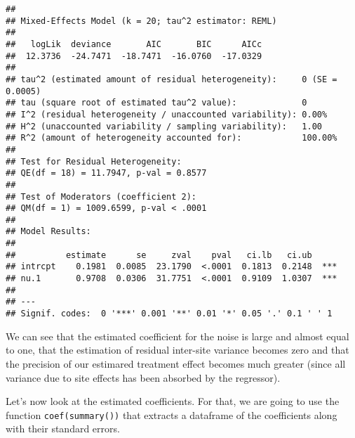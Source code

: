 \documentclass[]{book}
\theoremstyle{definition}
\theoremstyle{definition}
\theoremstyle{definition}
\theoremstyle{remark}
\begin{document}
\begin{verbatim}
## 
## Mixed-Effects Model (k = 20; tau^2 estimator: REML)
## 
##   logLik  deviance       AIC       BIC      AICc 
##  12.3736  -24.7471  -18.7471  -16.0760  -17.0329   
## 
## tau^2 (estimated amount of residual heterogeneity):     0 (SE = 0.0005)
## tau (square root of estimated tau^2 value):             0
## I^2 (residual heterogeneity / unaccounted variability): 0.00%
## H^2 (unaccounted variability / sampling variability):   1.00
## R^2 (amount of heterogeneity accounted for):            100.00%
## 
## Test for Residual Heterogeneity:
## QE(df = 18) = 11.7947, p-val = 0.8577
## 
## Test of Moderators (coefficient 2):
## QM(df = 1) = 1009.6599, p-val < .0001
## 
## Model Results:
## 
##          estimate      se     zval    pval   ci.lb   ci.ub 
## intrcpt    0.1981  0.0085  23.1790  <.0001  0.1813  0.2148  *** 
## nu.1       0.9708  0.0306  31.7751  <.0001  0.9109  1.0307  *** 
## 
## ---
## Signif. codes:  0 '***' 0.001 '**' 0.01 '*' 0.05 '.' 0.1 ' ' 1
\end{verbatim}

We can see that the estimated coefficient for the noise is large and almost equal to one, that the estimation of residual inter-site variance becomes zero and that the precision of our estimared treatment effect becomes much greater (since all variance due to site effects has been absorbed by the regressor).

Let's now look at the estimated coefficients.
For that, we are going to use the function \texttt{coef(summary())} that extracts a dataframe of the coefficients along with their standard errors.
\end{document}
